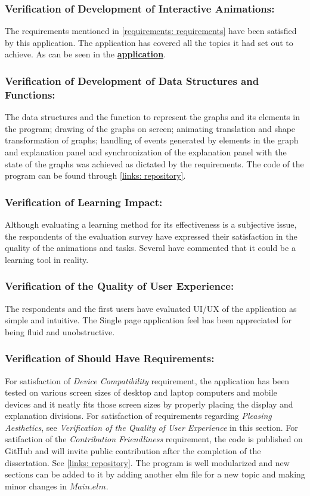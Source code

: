 \subsubsection{Verification of Development of Interactive Animations:}
The requirements mentioned in \autoref{requirements: requirements} have been
satisfied by this application.  The application has covered all the
topics it had set out to achieve. As can be seen in the
\href{https://visualise-graph-problems-with-me.netlify.app/} {\textbf{application}}.



\subsubsection{Verification of Development of Data Structures and Functions:}
The data structures and the function to represent the graphs and its elements
in the program; drawing of the graphs on screen; animating translation and
shape transformation of graphs; handling of events generated by elements in the
graph and explanation panel and synchronization of the explanation panel with
the state of the graphs was achieved as dictated by the requirements. The
code of the program can be found through \autoref{links: repository}.
 

\subsubsection{Verification of Learning Impact:}
Although evaluating a learning method for its effectiveness is a subjective
issue, the respondents of the evaluation survey have expressed their
satisfaction in the quality of the animations and tasks. Several have
commented that it could be a learning tool in reality.

\subsubsection{Verification of the Quality of User Experience:}
The respondents and the first users have evaluated UI/UX of the application as
simple and intuitive. The Single page application feel has been appreciated for being 
fluid and unobstructive. 

\subsubsection{Verification of Should Have Requirements:}
For satisfaction of \emph{Device Compatibility} requirement, the application has been
tested on various screen sizes of desktop and laptop computers and mobile
devices and it neatly fits those screen sizes by properly placing the display and
explanation divisions.
For satisfaction of requirements regarding \emph{Pleasing Aesthetics}, see \emph{Verification of the Quality of
User Experience} in this section.
For satifaction of the \emph{Contribution Friendliness} requirement, the code
is published on GitHub and will invite public contribution
after the completion of the dissertation. See \autoref{links: repository}.  The
program is well modularized and new sections can be added to it by adding
another elm file for a new topic and making minor changes in $Main.elm$.
